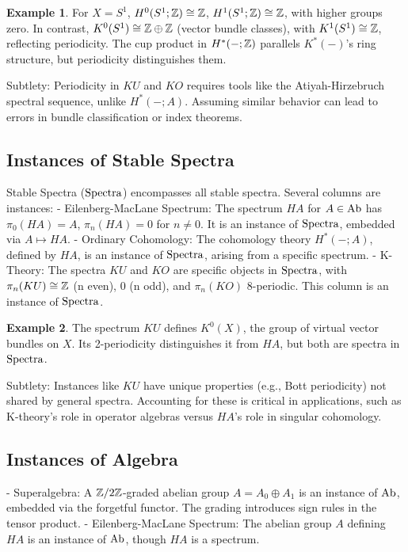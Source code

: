 \documentclass{article}
\theoremstyle{plain}
\theoremstyle{definition}
\newtheorem{example}{Example}
\begin{document}
\begin{example}
For \(X = S^1\), \(H^0(S^1; \mathbb{Z}) \cong \mathbb{Z}\), \(H^1(S^1; \mathbb{Z}) \cong \mathbb{Z}\), with higher groups zero. In contrast, \(K^0(S^1) \cong \mathbb{Z} \oplus \mathbb{Z}\) (vector bundle classes), with \(K^1(S^1) \cong \mathbb{Z}\), reflecting periodicity. The cup product in \(H^*(-; \mathbb{Z})\) parallels \(K^*(-)\)’s ring structure, but periodicity distinguishes them.
\end{example}

Subtlety: Periodicity in \(KU\) and \(KO\) requires tools like the Atiyah-Hirzebruch spectral sequence, unlike \(H^*(-; A)\). Assuming similar behavior can lead to errors in bundle classification or index theorems.

\subsection{Instances of Stable Spectra}
Stable Spectra (\(\text{Spectra}\)) encompasses all stable spectra. Several columns are instances:
- Eilenberg-MacLane Spectrum: The spectrum \(HA\) for \(A \in \text{Ab}\) has \(\pi_0(HA) = A\), \(\pi_n(HA) = 0\) for \(n \neq 0\). It is an instance of \(\text{Spectra}\), embedded via \(A \mapsto HA\).
- Ordinary Cohomology: The cohomology theory \(H^*(-; A)\), defined by \(HA\), is an instance of \(\text{Spectra}\), arising from a specific spectrum.
- K-Theory: The spectra \(KU\) and \(KO\) are specific objects in \(\text{Spectra}\), with \(\pi_n(KU) \cong \mathbb{Z}\) (n even), 0 (n odd), and \(\pi_n(KO)\) 8-periodic. This column is an instance of \(\text{Spectra}\).

\begin{example}
The spectrum \(KU\) defines \(K^0(X)\), the group of virtual vector bundles on \(X\). Its 2-periodicity distinguishes it from \(HA\), but both are spectra in \(\text{Spectra}\).
\end{example}

Subtlety: Instances like \(KU\) have unique properties (e.g., Bott periodicity) not shared by general spectra. Accounting for these is critical in applications, such as K-theory’s role in operator algebras versus \(HA\)’s role in singular cohomology.

\subsection{Instances of Algebra}
- Superalgebra: A \(\mathbb{Z}/2\mathbb{Z}\)-graded abelian group \(A = A_0 \oplus A_1\) is an instance of \(\text{Ab}\), embedded via the forgetful functor. The grading introduces sign rules in the tensor product.
- Eilenberg-MacLane Spectrum: The abelian group \(A\) defining \(HA\) is an instance of \(\text{Ab}\), though \(HA\) is a spectrum.
\end{document}

